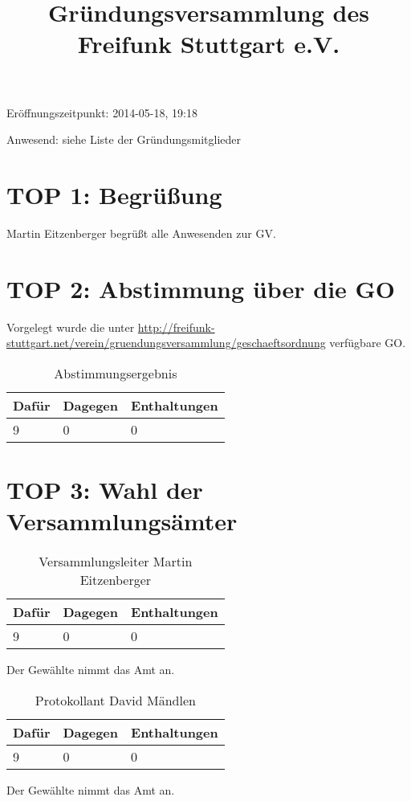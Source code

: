 \documentclass[a4paper]{scrartcl}
\title{Gründungsversammlung des Freifunk Stuttgart e.V.}
\begin{document}
\maketitle

\tableofcontents

\clearpage

\listoftables

\clearpage

Eröffnungszeitpunkt: 2014-05-18, 19:18

Anwesend: siehe Liste der Gründungsmitglieder

\section{TOP 1: Begrüßung}
Martin Eitzenberger begrüßt alle Anwesenden zur GV.

\section{TOP 2: Abstimmung über die GO}
Vorgelegt wurde die unter \url{http://freifunk-stuttgart.net/verein/gruendungsversammlung/geschaeftsordnung} verfügbare GO.

\begin{table}[h]
\begin{tabularx}{\textwidth}{XXX}
Dafür & Dagegen & Enthaltungen\\
\toprule
9 & 0 & 0\\
\end{tabularx}
\caption{Abstimmungsergebnis}
\end{table}

\clearpage

\section{TOP 3: Wahl der Versammlungsämter}
\begin{table}[h]
\begin{tabularx}{\textwidth}{XXX}
Dafür & Dagegen & Enthaltungen\\
\toprule
9 & 0 & 0\\
\end{tabularx}
\caption{Versammlungsleiter Martin Eitzenberger}
\end{table}
Der Gewählte nimmt das Amt an.

\begin{table}[h]
\begin{tabularx}{\textwidth}{XXX}
Dafür & Dagegen & Enthaltungen\\
\toprule
9 & 0 & 0\\
\end{tabularx}
\caption{Protokollant David Mändlen}
\end{table}
Der Gewählte nimmt das Amt an.
\end{document}
